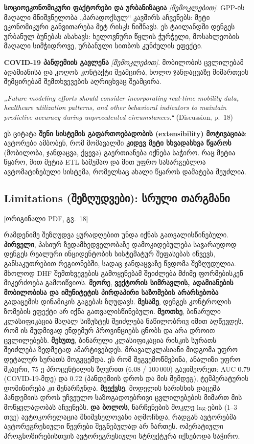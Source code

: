 \documentclass[11pt,a4paper]{article}
\newcommand{\imp}[1]{\textbf{\color{importred}#1}}
\newcommand{\pg}[1]{{\small\color{gray}[ორიგინალი PDF, გვ.~#1]}}
\begin{document}
\textbf{სოციოეკონომიკური ფაქტორები და ურბანიზაცია} \textit{[შემოკლებით]}. GPP-ის მაღალი მნიშვნელობა
„პარადოქსულ“ კავშირს აჩვენებს: მეტი ეკონომიკური განვითარება მეტ რისკს ნიშნავს. ეს ტაილანდში დენგეს
ურბანულ ბუნებას ასახავს: ხელოვნური წყლის ჭურჭელი, მოსახლეობის მაღალი სიმჭიდროვე, ურბანული სითბოს კუნძულის ეფექტი.

\textbf{COVID-19 პანდემიის გავლენა} \textit{[შემოკლებით]}. მობილობის ცვლილებამ ადამიანისა და კოღოს კონტაქტი შეამცირა,
ხოლო ჯანდაცვაზე მიმართვის შემცირებამ შემთხვევების აღრიცხვაც შეამცირა.

\begin{citat}
\textit{„Future modeling efforts should consider incorporating real-time mobility data, healthcare utilization patterns, and other behavioral indicators to maintain predictive accuracy during unprecedented circumstances.“} (Discussion, p.~18)
\end{citat}

\begin{etl}
ეს ციტატა \imp{შენი სისტემის გაფართოებადობის (extensibility) მოტივაციაა}: ავტორები ამბობენ, რომ მომავალში
\textbf{კიდევ მეტი სხვადასხვა წყაროს} (მობილობა, ჯანდაცვა, ქცევა) გაერთიანება იქნება საჭირო. რაც მეტია წყარო,
მით მეტია ETL სამუშაო და მით უფრო სასარგებლოა ავტომატიზებული სისტემა, რომელსაც ახალი წყაროს დამატება შეუძლია.
\end{etl}

\subsection*{Limitations (შეზღუდვები): სრული თარგმანი} \pg{18}

რამდენიმე შეზღუდვა ყურადღებით უნდა იქნას გათვალისწინებული. \textbf{პირველი}, პასიურ ზედამხედველობაზე
დამოკიდებულება სავარაუდოდ დენგეს რეალური ინციდენტობის სისტემატურ შეფასებას იწვევს, განსაკუთრებით
რეგიონებში, სადაც ჯანდაცვაზე წვდომა შეზღუდულია. მხოლოდ DHF შემთხვევების გამოყენებამ შეიძლება
მძიმე ფორმებისკენ მიკერძოება გამოიწვიოს. \textbf{მეორე}, \imp{ვექტორის სიმრავლის, ადამიანების მობილობისა და
იმუნიტეტის პირდაპირი საზომების არარსებობა} გადაცემის დინამიკის გაგებას ზღუდავს. \textbf{მესამე}, დენგეს
კონტროლის ზომების ეფექტი არ იქნა გათვალისწინებული. \textbf{მეოთხე}, ბინარული კლასიფიკაცია მაღალ სიზუსტეს
შეიძლება ნაწილობრივ იმით აღწევდეს, რომ ის მუდმივად ენდემურ პროვინციებს ცნობს და არა დროით ცვლილებებს.
\textbf{მეხუთე}, ბინარული კლასიფიკაცია რისკის სურათს შეიძლება ზედმეტად ამარტივებდეს. მრავალკლასიანი მიდგომა
უფრო დეტალურ სურათს მოგვცემდა. ეს რომ შეგვემოწმებინა, ანალიზი უფრო მკაცრი, 75-ე პროცენტილის ზღვრით
(6.08 / 100\,000) გავიმეორეთ: AUC 0.79 (COVID-19-მდე) და 0.72 (პანდემიის დროს და მის შემდეგ), ტემპერატურის
დომინირება კი შენარჩუნდა. \textbf{მეექვსე}, მოდელის ხარისხის დაცემა პანდემიის დროს უჩვეულო საზოგადოებრივი
ცვლილებების მიმართ მის მოწყვლადობას აჩვენებს. \textbf{და ბოლოს}, ნარჩენების მოკლე lag-ების (1--3 თვე)
ავტოკორელაცია მნიშვნელოვანი აღმოჩნდა, რადგან ავტორებმა ავტორეგრესიული წევრები შეგნებულად არ ჩართეს.
ოპერატიული პროგნოზირებისთვის ავტორეგრესიული სტრუქტურა იქნებოდა საჭირო.
\end{document}
